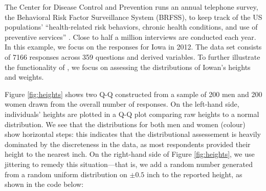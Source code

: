 \label{sec:brfss}

The Center for Disease Control and Prevention runs an annual telephone
survey, the Behavioral Risk Factor Surveillance System (BRFSS), to keep
track of the US populations' ``health-related risk behaviors, chronic
health conditions, and use of preventive services'' \citep{brfss}. Close
to half a million interviews are conducted each year. In this example,
we focus on the responses for Iowa in 2012. The data set consists of
7166 responses across 359 questions and derived variables. To further
illustrate the functionality of , we focus on assessing the
distributions of Iowan's heights and weights.

Figure \ref{fig:heights} shows two Q-Q constructed from a sample of 200
men and 200 women drawn from the overall number of responses. On the
left-hand side, individuals' heights are plotted in a Q-Q plot comparing
raw heights to a normal distribution. We see that the distributions for
both men and women (colour) show horizontal steps: this indicates that
the distributional assessement is heavily dominated by the discreteness
in the data, as most respondents provided their height to the nearest
inch. On the right-hand side of Figure \ref{fig:heights}, we use
jittering to remedy this situation---that is, we add a random number
generated from a random uniform distribution on \(\pm 0.5\) inch to the
reported height, as shown in the code below:

